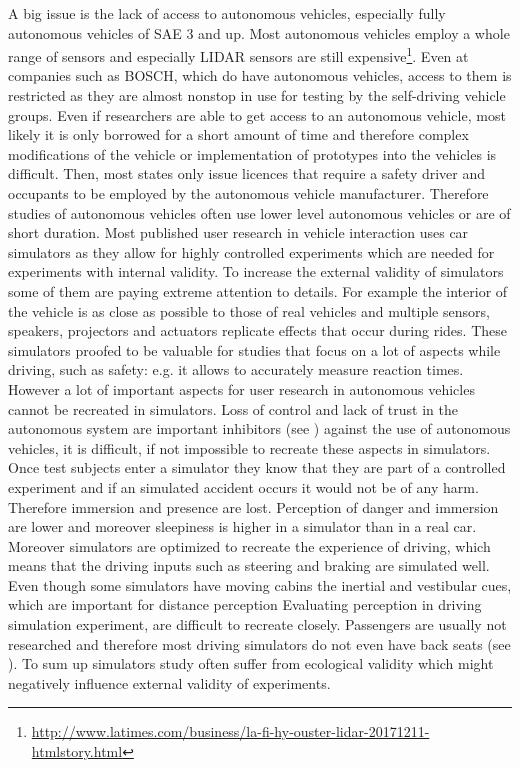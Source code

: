 A big issue is the lack of access to autonomous vehicles, especially fully autonomous vehicles of SAE 3 and up. Most autonomous vehicles employ a whole range of sensors and especially LIDAR sensors are still expensive\footnote{\url{http://www.latimes.com/business/la-fi-hy-ouster-lidar-20171211-htmlstory.html}}. Even at companies such as BOSCH, which do have autonomous vehicles, access to them is restricted as they are almost nonstop in use for testing by the self-driving vehicle groups. Even if researchers are able to get access to an autonomous vehicle, most likely it is only borrowed for a short amount of time and therefore complex modifications of the vehicle or implementation of prototypes into the vehicles is difficult. Then, most states only issue licences that require a safety driver and occupants to be employed by the autonomous vehicle manufacturer\cite{Jones2013AutonomousReport}. Therefore studies of autonomous vehicles often use lower level autonomous vehicles or are of short duration. 
Most published user research in vehicle interaction uses car simulators as they allow for highly controlled experiments which are needed for experiments with internal validity. To increase the external validity of simulators some of them are paying extreme attention to details. For example the interior of the vehicle is as close as possible to those of real vehicles and multiple sensors, speakers, projectors and actuators replicate effects that occur during rides. These simulators proofed to be valuable for studies that focus on a lot of aspects while driving, such as safety: e.g. it allows to accurately measure reaction times. However a lot of important aspects for user research in autonomous vehicles cannot be recreated in simulators. Loss of control and lack of trust in the autonomous system are important inhibitors (see ) against the use of autonomous vehicles, it is difficult, if not impossible to recreate these aspects in simulators. Once test subjects enter a simulator they know that they are part of a controlled experiment and if an simulated accident occurs it would not be of any harm. Therefore immersion and presence are lost. Perception of danger and immersion are lower and moreover sleepiness is higher in a simulator than in a real car\cite{Hallvig2013}. Moreover simulators are optimized to recreate the experience of driving, which means that the driving inputs such as steering and braking are simulated well. Even though some simulators have moving cabins the inertial and vestibular cues, which are important for distance perception Evaluating perception in driving simulation experiment, are difficult to recreate closely. Passengers are usually not researched and therefore most driving simulators do not even have back seats (see ).  To sum up simulators study often suffer from ecological validity which might negatively influence external validity of experiments. 

